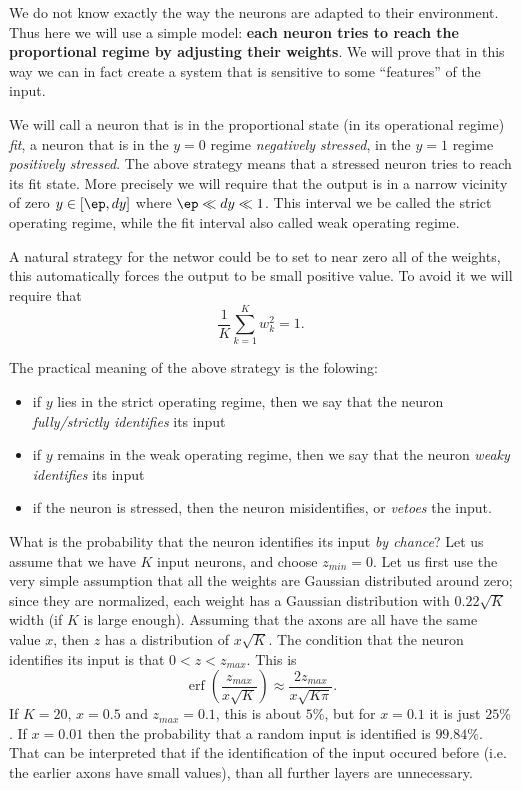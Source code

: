 \documentclass[10pt,a4paper]{article}
\begin{document}
We do not know exactly the way the neurons are adapted to their environment. Thus here we will use a simple model: \textbf{each neuron tries to reach the proportional regime by adjusting their weights}. We will prove that in this way we can in fact create a system that is sensitive to some ``features'' of the input.

We will call a neuron that is in the proportional state (in its operational regime) \emph{fit}, a neuron that is in the $y=0$ regime \emph{negatively stressed}, in the $y=1$ regime \emph{positively stressed}. The above strategy means that a stressed neuron tries to reach its fit state. More precisely we will require that the output is in a narrow vicinity of zero $y\in[\ep, dy]$ where $\ep\ll dy\ll 1$. This interval we be called the strict operating regime, while the fit interval also called weak operating regime.

A natural strategy for the networ could be to set to near zero all of the weights, this automatically forces the output to be small positive value. To avoid it we will require that
\begin{equation}
  \frac1K\sum_{k=1}^K w_k^2 = 1.
\end{equation}

The practical meaning of the above strategy is the folowing:
\begin{itemize}
\item if $y$ lies in the strict operating regime, then we say that the neuron \emph{fully/strictly identifies} its input
\item if $y$ remains in the weak operating regime, then we say that the neuron \emph{weaky identifies} its input
\item if the neuron is stressed, then the neuron misidentifies, or \emph{vetoes} the input. 
\end{itemize}

What is the probability that the neuron identifies its input \emph{by chance}? Let us assume that we have $K$ input neurons, and choose $z_{min}=0$. Let us first use the very simple assumption that all the weights are Gaussian distributed around zero; since they are normalized, each weight has a Gaussian distribution with $0.22\sqrt{K}$ width (if $K$ is large enough). Assuming that the axons are all have the same value $x$, then $z$ has a distribution of $x\sqrt{K}$. The condition that the neuron identifies its input is that $0<z<z_{max}$. This is
\begin{equation}
  \mathop{\mathrm{erf}}(\frac {z_{max}}{x\sqrt{K}})\approx \frac{2z_{max}}{x\sqrt{K\pi}}.
\end{equation}
If $K=20,\,x=0.5$ and $z_{max}=0.1$, this is about $5\%$, but for $x=0.1$ it is just $25\%$. If $x=0.01$ then the probability that a random input is identified is $99.84\%$. That can be interpreted that if the identification of the input occured before (i.e. the earlier axons have small values), than all further layers are unnecessary.
\end{document}

